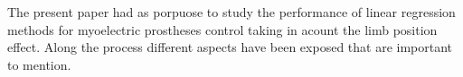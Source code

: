The present paper had as porpuose to study the performance of linear regression methods for myoelectric prostheses control taking in acount the limb position effect. Along the process different aspects have been exposed that are important to mention.\\
	
